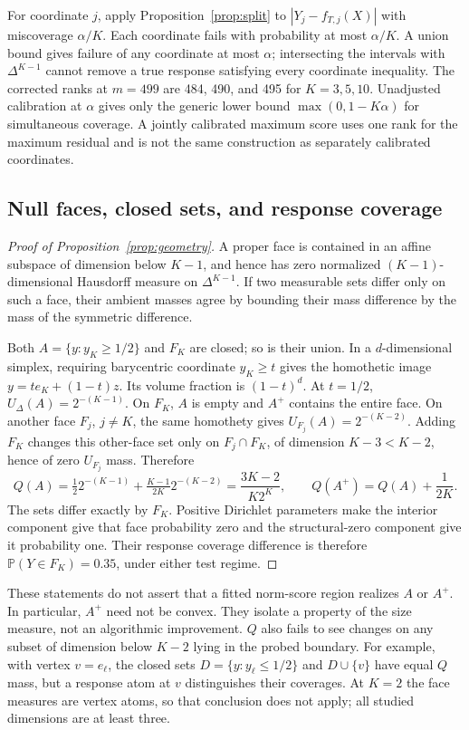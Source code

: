\documentclass{article}
\theoremstyle{plain}
\newcommand{\simp}{\Delta^{K-1}}
\newcommand{\Prob}{\mathbb{P}}
\newcommand{\Udel}{U_{\Delta}}
\begin{document}
For coordinate $j$, apply Proposition~\ref{prop:split} to $|Y_j-f_{T,j}(X)|$ with miscoverage $\alpha/K$. Each coordinate fails with probability at most $\alpha/K$. A union bound gives failure of any coordinate at most $\alpha$; intersecting the intervals with $\simp$ cannot remove a true response satisfying every coordinate inequality. The corrected ranks at $m=499$ are 484, 490, and 495 for $K=3,5,10$. Unadjusted calibration at $\alpha$ gives only the generic lower bound $\max(0,1-K\alpha)$ for simultaneous coverage. A jointly calibrated maximum score uses one rank for the maximum residual and is not the same construction as separately calibrated coordinates.

\subsection{Null faces, closed sets, and response coverage}
\begin{proof}[Proof of Proposition~\ref{prop:geometry}]
A proper face is contained in an affine subspace of dimension below $K-1$, and hence has zero normalized $(K-1)$-dimensional Hausdorff measure on $\simp$. If two measurable sets differ only on such a face, their ambient masses agree by bounding their mass difference by the mass of the symmetric difference.

Both $A=\{y:y_K\geq1/2\}$ and $F_K$ are closed; so is their union. In a $d$-dimensional simplex, requiring barycentric coordinate $y_K\geq t$ gives the homothetic image $y=t e_K+(1-t)z$. Its volume fraction is $(1-t)^d$. At $t=1/2$, $\Udel(A)=2^{-(K-1)}$. On $F_K$, $A$ is empty and $A^+$ contains the entire face. On another face $F_j$, $j\ne K$, the same homothety gives $U_{F_j}(A)=2^{-(K-2)}$. Adding $F_K$ changes this other-face set only on $F_j\cap F_K$, of dimension $K-3<K-2$, hence of zero $U_{F_j}$ mass. Therefore
\begin{equation}
 Q(A)=\tfrac12 2^{-(K-1)}+\tfrac{K-1}{2K}2^{-(K-2)}
      =\frac{3K-2}{K2^K},\qquad Q(A^+)=Q(A)+\frac1{2K}.
\end{equation}
The sets differ exactly by $F_K$. Positive Dirichlet parameters make the interior component give that face probability zero and the structural-zero component give it probability one. Their response coverage difference is therefore $\Prob(Y\in F_K)=0.35$, under either test regime.
\end{proof}

These statements do not assert that a fitted norm-score region realizes $A$ or $A^+$. In particular, $A^+$ need not be convex. They isolate a property of the size measure, not an algorithmic improvement. $Q$ also fails to see changes on any subset of dimension below $K-2$ lying in the probed boundary. For example, with vertex $v=e_\ell$, the closed sets $D=\{y:y_\ell\leq1/2\}$ and $D\cup\{v\}$ have equal $Q$ mass, but a response atom at $v$ distinguishes their coverages. At $K=2$ the face measures are vertex atoms, so that conclusion does not apply; all studied dimensions are at least three.
\end{document}
